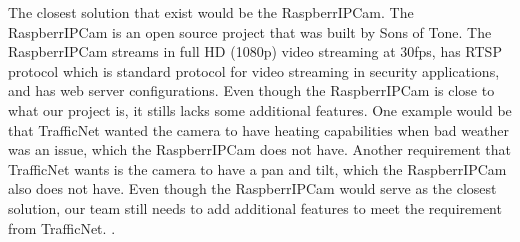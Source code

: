 The closest solution that exist would be the RaspberrIPCam. The RaspberrIPCam is an open source project that was built by Sons of Tone. The RaspberrIPCam streams in full HD (1080p) video streaming at 30fps, has RTSP protocol which is standard protocol for video streaming in security applications, and has web server configurations. Even though the RaspberrIPCam is close to what our project is, it stills lacks some additional features. One example would be that TrafficNet wanted the camera to have heating capabilities when bad weather was an issue, which the RaspberrIPCam does not have. Another requirement that TrafficNet wants is the camera to have a pan and tilt, which the RaspberrIPCam also does not have. Even though the RaspberrIPCam would serve as the closest solution, our team still needs to add additional features to meet the requirement from TrafficNet. \cite{SonsOfTone2014}.
